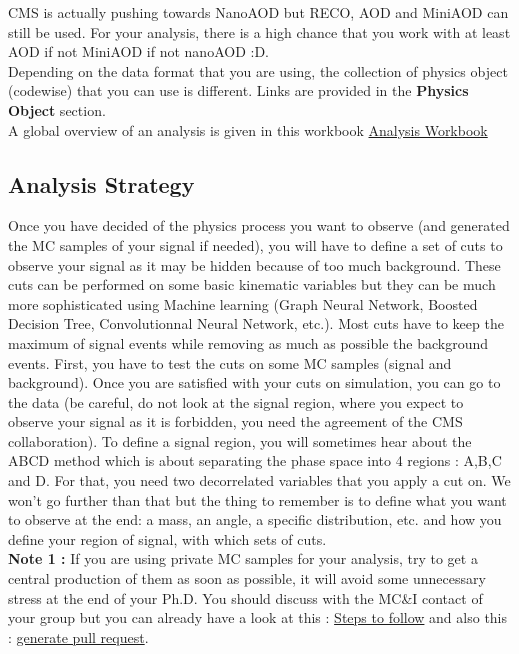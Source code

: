 \documentclass[reprint, a4paper, nofootinbib, amsmath, amssymb, aps]{revtex4-1}
\begin{document}
    CMS is actually pushing towards NanoAOD but RECO, AOD and MiniAOD can still be used. For your analysis, there is a high chance that you work with at least AOD if not MiniAOD if not nanoAOD :D. \\
    Depending on the data format that you are using, the collection of physics object (codewise) that you can use is different. Links are provided in the \textbf{Physics Object} section.\\

    A global overview of an analysis is given in this workbook \href{https://twiki.cern.ch/twiki/bin/view/CMSPublic/WorkBook}{Analysis Workbook}\\
        
    
\subsection{Analysis Strategy}
    Once you have decided of the physics process you want to observe (and generated the MC samples of your signal if needed), you will have to define a set of cuts to observe your signal as it may be hidden because of too much background. These cuts can be performed on some basic kinematic variables but they can be much more sophisticated using Machine learning (Graph Neural Network, Boosted Decision Tree, Convolutionnal Neural Network, etc.). Most cuts have to keep the maximum of signal events while removing as much as possible the background events. First, you have to test the cuts on some MC samples (signal and background). Once you are satisfied with your cuts on simulation, you can go to the data (be careful, do not look at the signal region, where you expect to observe your signal as it is forbidden, you need the agreement of the CMS collaboration). To define a signal region, you will sometimes hear about the ABCD method which is about separating the phase space into 4 regions : A,B,C and D. For that, you need two decorrelated variables that you apply a cut on.
    We won't go further than that but the thing to remember is to define what you want to observe at the end: a mass, an angle, a specific distribution, etc. and how you define your region of signal, with which sets of cuts.\\
    \textbf{Note 1 :} If you are using private MC samples for your analysis, try to get a central production of them as soon as possible, it will avoid some unnecessary stress at the end of your Ph.D. You should discuss with the MC\&I contact of your group but you can already have a look at this : \href{https://cms-pdmv.gitbook.io/project/mccontact#preliminary-steps}{Steps to follow} and also this : \href{https://twiki.cern.ch/twiki/bin/viewauth/CMS/GitRepositoryForGenProduction}{generate pull request}.
\end{document}
